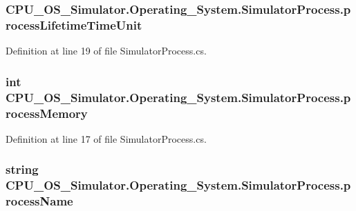 \subsubsection[{process\+Lifetime\+Time\+Unit}]{ C\+P\+U\+\_\+\+O\+S\+\_\+\+Simulator.\+Operating\+\_\+\+System.\+Simulator\+Process.\+process\+Lifetime\+Time\+Unit\hspace{0.3cm}{\ttfamily [private]}}\label{class_c_p_u___o_s___simulator_1_1_operating___system_1_1_simulator_process_a53aad888e888ff8f9a3999047f14d362}


Definition at line 19 of file Simulator\+Process.\+cs.

\hypertarget{class_c_p_u___o_s___simulator_1_1_operating___system_1_1_simulator_process_af574b021e490c03ed55332ee0ed4c067}{}
\subsubsection[{process\+Memory}]{\setlength{\rightskip}{0pt plus 5cm}int C\+P\+U\+\_\+\+O\+S\+\_\+\+Simulator.\+Operating\+\_\+\+System.\+Simulator\+Process.\+process\+Memory\hspace{0.3cm}{\ttfamily [private]}}\label{class_c_p_u___o_s___simulator_1_1_operating___system_1_1_simulator_process_af574b021e490c03ed55332ee0ed4c067}


Definition at line 17 of file Simulator\+Process.\+cs.

\hypertarget{class_c_p_u___o_s___simulator_1_1_operating___system_1_1_simulator_process_a6d29b67977f07ebb1b6336b96960752b}{}
\subsubsection[{process\+Name}]{\setlength{\rightskip}{0pt plus 5cm}string C\+P\+U\+\_\+\+O\+S\+\_\+\+Simulator.\+Operating\+\_\+\+System.\+Simulator\+Process.\+process\+Name\hspace{0.3cm}{\ttfamily [private]}}\label{class_c_p_u___o_s___simulator_1_1_operating___system_1_1_simulator_process_a6d29b67977f07ebb1b6336b96960752b}


